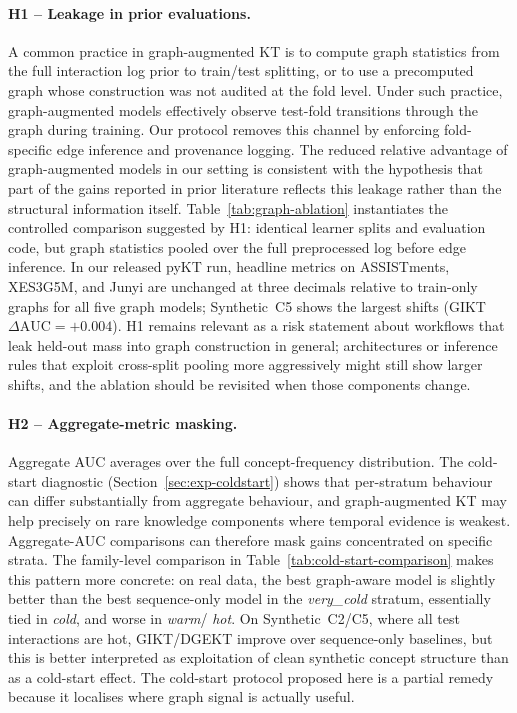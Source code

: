 \documentclass[pdflatex,sn-basic]{sn-jnl}
\newcommand{\KCs}{knowledge components}
\begin{document}
\paragraph{H1 -- Leakage in prior evaluations.}
A common practice in graph-augmented KT is to compute graph statistics
from the full interaction log prior to train/test splitting, or to use
a precomputed graph whose construction was not audited at the fold
level. Under such practice, graph-augmented models effectively observe
test-fold transitions through the graph during training. Our protocol
removes this channel by enforcing fold-specific edge inference and
provenance logging. The reduced relative advantage of graph-augmented
models in our setting is consistent with the hypothesis that part of
the gains reported in prior literature reflects this leakage rather
than the structural information itself.
Table~\ref{tab:graph-ablation} instantiates the controlled comparison suggested by H1:
identical learner splits and evaluation code, but graph statistics pooled over the full
preprocessed log before edge inference.
In our released pyKT run, headline metrics on ASSISTments, XES3G5M, and Junyi are
unchanged at three decimals relative to train-only graphs for all five graph models;
Synthetic~C5 shows the largest shifts (GIKT $\Delta\text{AUC}{=}{+}0.004$).
H1 remains relevant as a risk statement about workflows that leak held-out mass into
graph construction in general; architectures or inference rules that exploit
cross-split pooling more aggressively might still show larger shifts, and the ablation
should be revisited when those components change.

\paragraph{H2 -- Aggregate-metric masking.}
Aggregate AUC averages over the full concept-frequency distribution.
The cold-start diagnostic (Section~\ref{sec:exp-coldstart}) shows that
per-stratum behaviour can differ substantially from aggregate
behaviour, and graph-augmented KT may help precisely on rare \KCs{}
where temporal evidence is weakest. Aggregate-AUC comparisons can
therefore mask gains concentrated on specific strata. The family-level
comparison in Table~\ref{tab:cold-start-comparison} makes this pattern
more concrete: on real data, the best graph-aware model is slightly
better than the best sequence-only model in the \emph{very\_cold}
stratum, essentially tied in \emph{cold}, and worse in \emph{warm}/
\emph{hot}. On Synthetic~C2/C5, where all test interactions are hot,
GIKT/DGEKT improve over sequence-only baselines, but this is better
interpreted as exploitation of clean synthetic concept structure than
as a cold-start effect. The cold-start protocol proposed here is a
partial remedy because it localises where graph signal is actually
useful.
\end{document}
